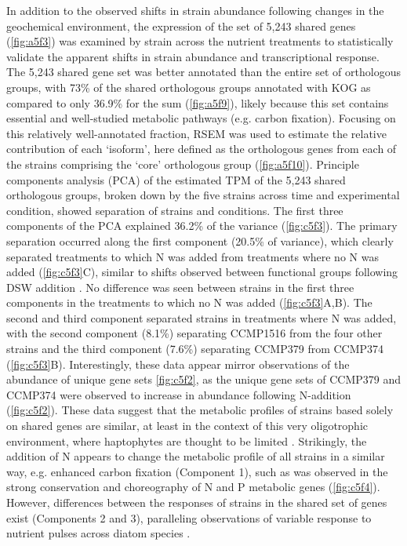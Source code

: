 In addition to the observed shifts in strain abundance following changes in the geochemical environment, the expression of the set of 5,243 shared genes (\cref{fig:a5f3}) was examined by strain across the nutrient treatments to statistically validate the apparent shifts in strain abundance and transcriptional response. The 5,243 shared gene set was better annotated than the entire set of orthologous groups, with 73\% of the shared orthologous groups annotated with KOG as compared to only 36.9\% for the sum (\cref{fig:a5f9}), likely because this set contains essential and well-studied metabolic pathways (e.g. carbon fixation). Focusing on this relatively well-annotated fraction, RSEM \citep{Li2011} was used to estimate the relative contribution of each `isoform', here defined as the orthologous genes from each of the strains comprising the `core' orthologous group (\cref{fig:a5f10}). Principle components analysis (PCA) of the estimated TPM of the 5,243 shared orthologous groups, broken down by the five strains across time and experimental condition, showed separation of strains and conditions. The first three components of the PCA explained 36.2\% of the variance (\cref{fig:c5f3}). The primary separation occurred along the first component (20.5\% of variance), which clearly separated treatments to which N was added from treatments where no N was added (\cref{fig:c5f3}C), similar to shifts observed between functional groups following DSW addition \citep{Alexander2015a}. No difference was seen between strains in the first three components in the treatments to which no N was added (\cref{fig:c5f3}A,B). The second and third component separated strains in treatments where N was added, with the second component (8.1\%) separating CCMP1516 from the four other strains and the third component (7.6\%) separating CCMP379 from CCMP374 (\cref{fig:c5f3}B). Interestingly, these data appear mirror observations of the abundance of unique gene sets \cref{fig:c5f2}, as the unique gene sets of CCMP379 and CCMP374 were observed to increase in abundance following N-addition (\cref{fig:c5f2}). These data suggest that the metabolic profiles of strains based solely on shared genes are similar, at least in the context of this very oligotrophic environment, where haptophytes are thought to be limited \citep{Alexander2015a}. Strikingly, the addition of N appears to change the metabolic profile of all strains in a similar way, e.g. enhanced carbon fixation (Component 1), such as was observed in the strong conservation and choreography of N and P metabolic genes (\cref{fig:c5f4}). However, differences between the responses of strains in the shared set of genes exist (Components 2 and 3), paralleling observations of variable response to nutrient pulses across diatom species \citep{Alexander2015}.  \par


